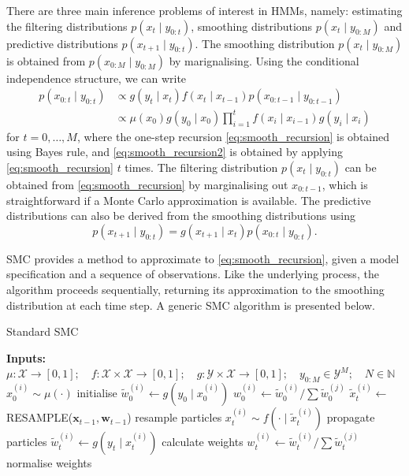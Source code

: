 \documentclass{article}
\begin{document}
There are three main inference problems of interest in HMMs, namely: estimating the filtering distributions $p(x_t \mid y_{0:t})$, smoothing distributions $p(x_{t} \mid y_{0:M})$ and predictive distributions $p(x_{t+1} \mid y_{0:t})$. 
The smoothing distribution $p(x_{t} \mid y_{0:M})$ is obtained from $p(x_{0:M} \mid y_{0:M})$ by marignalising. Using the conditional independence structure, we can write
\begin{align}
p(x_{0:t} \mid y_{0:t}) &\propto g(y_t \mid x_t) f(x_t\mid x_{t-1}) p(x_{0:t-1}\mid y_{0:t-1}) \label{eq:smooth_recursion}\\
&\propto \mu(x_0) g(y_0\mid x_0) \prod_{i=1}^t f(x_i \mid x_{i-1}) g(y_i\mid x_i) \label{eq:smooth_recursion2}
\end{align}
for $t = 0,\dots,M$, where the one-step recursion \eqref{eq:smooth_recursion} is obtained using Bayes rule, and \eqref{eq:smooth_recursion2} is obtained by applying \eqref{eq:smooth_recursion} $t$ times. 
The filtering distribution $p(x_t \mid y_{0:t})$ can be obtained from \eqref{eq:smooth_recursion} by marginalising out $x_{0:t-1}$, which is straightforward if a Monte Carlo approximation is available.
The predictive distributions can also be derived from the smoothing distributions using
\begin{equation*}
p(x_{t+1}\mid y_{0:t}) = g(x_{t+1} \mid x_t) p(x_{0:t} \mid y_{0:t}).
\end{equation*}

SMC provides a method to approximate to \eqref{eq:smooth_recursion}, given a model specification and a sequence of observations. Like the underlying process, the algorithm proceeds sequentially, returning its approximation to the smoothing distribution at each time step.
A generic SMC algorithm is presented below.
\begin{algorithm}
	\caption{Standard SMC}\label{alg:SMC}
	\begin{algorithmic}[0]
    	\State \textbf{Inputs:} $\mu:\mathcal{X}\to[0,1];\quad f:\mathcal{X}\times\mathcal{X}\to[0,1];\quad g:\mathcal{Y}\times\mathcal{X}\to[0,1];\quad y_{0:M}\in\mathcal{Y}^M;\quad N\in\mathbb{N}$
			\State $x_0^{(i)} \sim \mu(\cdot)$ \Comment initialise
			\State $\tilde{w}_0^{(i)} \gets g(y_0 \mid x_0^{(i)})$
			\State $w_0^{(i)} \gets \tilde{w}_0^{(i)} / \sum \tilde{w}_0^{(j)}$
		\EndFor
        		\State $\tilde{x}_t^{(i)} \gets$ {\footnotesize RESAMPLE}($\mathbf{x}_{t-1}, \mathbf{w}_{t-1}$) \Comment resample particles
				\State $x_t^{(i)} \sim f(\cdot \mid \tilde{x}_t^{(i)})$ \Comment propagate particles
				\State $\tilde{w}_t^{(i)} \gets g(y_t \mid x_t^{(i)})$ \Comment calculate weights
				\State $w_t^{(i)} \gets \tilde{w}_t^{(i)} / \sum \tilde{w}_t^{(j)}$ \Comment normalise weights
        	\EndFor
        \EndFor
	\end{algorithmic}
\end{algorithm}
\end{document}
